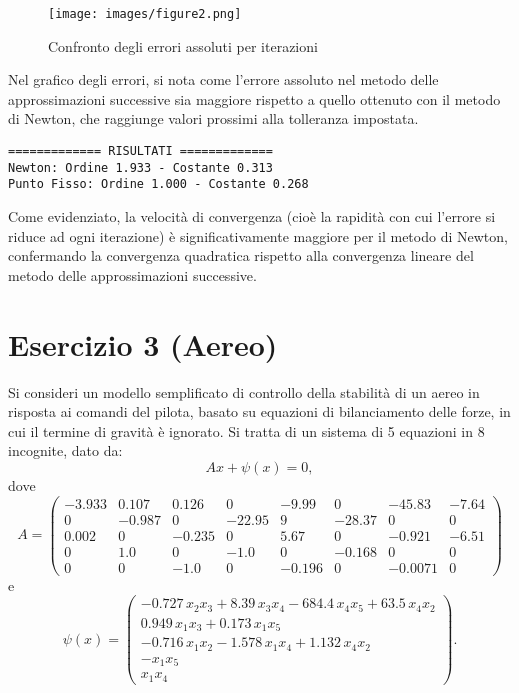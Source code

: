 \documentclass[11pt]{article}
\begin{document}
\begin{figure}[h]
  \centering
  \texttt{[image: images/figure2.png]} 
  \caption{Confronto degli errori assoluti per iterazioni}
  \label{fig:errore}
\end{figure}

Nel grafico degli errori, si nota come l'errore assoluto nel metodo delle approssimazioni successive sia maggiore rispetto a quello ottenuto con il metodo di Newton, che raggiunge valori prossimi alla tolleranza impostata.

\begin{lstlisting}[style=console]
============= RISULTATI =============
Newton: Ordine 1.933 - Costante 0.313
Punto Fisso: Ordine 1.000 - Costante 0.268	
\end{lstlisting}

Come evidenziato, la velocità di convergenza (cioè la rapidità con cui l'errore si riduce ad ogni iterazione) è significativamente maggiore per il metodo di Newton, confermando la convergenza quadratica rispetto alla convergenza lineare del metodo delle approssimazioni successive.








\section*{Esercizio 3 (Aereo)}

Si consideri un modello semplificato di controllo della stabilità di un aereo in risposta ai comandi del pilota, basato su equazioni di bilanciamento delle forze, in cui il termine di gravità è ignorato. Si tratta di un sistema di 5 equazioni in 8 incognite, dato da:
\begin{equation*}
  A x + \psi(x) = 0,
\end{equation*}
dove
\begin{equation*}
  A =
  \begin{pmatrix}
    -3.933 & 0.107 & 0.126 & 0     & -9.99  & 0      & -45.83 & -7.64 \\
    0      & -0.987& 0     & -22.95& 9      & -28.37& 0      & 0     \\
    0.002  & 0     & -0.235& 0     & 5.67   & 0      & -0.921 & -6.51 \\
    0      & 1.0   & 0     & -1.0  & 0      & -0.168& 0      & 0     \\
    0      & 0     & -1.0  & 0     & -0.196 & 0      & -0.0071& 0
  \end{pmatrix}
\end{equation*}
e
\begin{equation*}
  \psi(x) =
  \begin{pmatrix}
    -0.727\,x_2x_3 + 8.39\,x_3x_4 - 684.4\,x_4x_5 + 63.5\,x_4x_2 \\
    0.949\,x_1x_3 + 0.173\,x_1x_5 \\
    -0.716\,x_1x_2 - 1.578\,x_1x_4 + 1.132\,x_4x_2 \\
    -x_1x_5 \\
    x_1x_4
  \end{pmatrix}.
\end{equation*}
\end{document}
